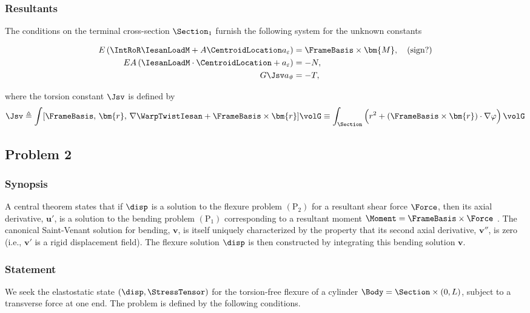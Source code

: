 \subsubsection{Resultants}
%
The conditions on the terminal cross-section \(\Section_1\) furnish the
following system for the unknown constants

\begin{equation}
{
\begin{aligned}
E\left(\IntRoR \IesanLoadM + A \CentroidLocation a_{\varepsilon}\right)&=\FrameBasis\times \bm{M}, \quad\text{(sign?)}\\
E A\left(\IesanLoadM\cdot\CentroidLocation +a_{\varepsilon}\right)&=-N, \\
G \Jsv a_{\vartheta}&=-T,
\end{aligned}}
\label{eq:2-15}
\end{equation}

where the torsion constant \(\Jsv\) is defined by
\begin{equation}
\Jsv 
\triangleq \int [\FrameBasis,\, \bm{r},\, \nabla\WarpTwistIesan + \FrameBasis\times\bm{r}] \volG 
\equiv\int_{\Section} \Big(r^2 + (\FrameBasis\times \bm{r})\cdot \nabla \varphi\Big)\, \volG
\label{eq:def-j-origin}
\end{equation}


\clearpage
\subsection{Problem 2}
\subsubsection{Synopsis}
A central theorem states that if $\disp$ is a solution to the flexure problem $(\mathrm{P}_2)$ for a resultant shear force $\Force$, then its axial derivative, $\bm{u}'$, is a solution to the bending problem $(\mathrm{P}_1)$ corresponding to a resultant moment $\Moment = \FrameBasis \times \Force$ \citep{iesan1986saintvenants}. 
The canonical Saint-Venant solution for bending, $\bm{v}$, is itself uniquely characterized by the property that its second axial derivative, $\bm{v}''$, is zero (i.e., $\bm{v}'$ is a rigid displacement field). 
The flexure solution $\disp$ is then constructed by integrating this bending solution $\bm{v}$.

\subsubsection{Statement}
We seek the elastostatic state $(\disp, \StressTensor)$ for the torsion-free flexure of a cylinder $\Body = \Section \times (0, L)$, subject to a transverse force at one end. The problem is defined by the following conditions.

